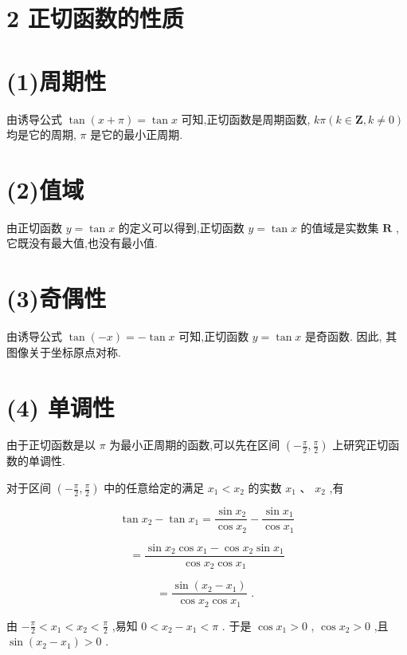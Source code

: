 \documentclass[10pt]{article}
\begin{document}
\section*{2 正切函数的性质}

\section*{(1)周期性}

由诱导公式 \(\tan \left( {x + \pi }\right)  = \tan x\) 可知,正切函数是周期函数, \({k\pi }\left( {k \in  \mathbf{Z},k \neq  0}\right)\) 均是它的周期, \(\pi\) 是它的最小正周期.

\section*{(2)值域}

由正切函数 \(y = \tan x\) 的定义可以得到,正切函数 \(y = \tan x\) 的值域是实数集 \(\mathbf{R}\) ,它既没有最大值,也没有最小值.

\section*{(3)奇偶性}

由诱导公式 \(\tan \left( {-x}\right)  =  - \tan x\) 可知,正切函数 \(y = \tan x\) 是奇函数. 因此, 其图像关于坐标原点对称.

\section*{(4) 单调性}

由于正切函数是以 \(\pi\) 为最小正周期的函数,可以先在区间 \(\left( {-\frac{\pi }{2},\frac{\pi }{2}}\right)\) 上研究正切函数的单调性.

对于区间 \(\left( {-\frac{\pi }{2},\frac{\pi }{2}}\right)\) 中的任意给定的满足 \({x}_{1} < {x}_{2}\) 的实数 \({x}_{1}\text{ 、 }{x}_{2}\) ,有

\[
\tan {x}_{2} - \tan {x}_{1} = \frac{\sin {x}_{2}}{\cos {x}_{2}} - \frac{\sin {x}_{1}}{\cos {x}_{1}}
\]

\[
= \frac{\sin {x}_{2}\cos {x}_{1} - \cos {x}_{2}\sin {x}_{1}}{\cos {x}_{2}\cos {x}_{1}}
\]

\[
= \frac{\sin \left( {{x}_{2} - {x}_{1}}\right) }{\cos {x}_{2}\cos {x}_{1}}\text{ . }
\]

由 \(- \frac{\pi }{2} < {x}_{1} < {x}_{2} < \frac{\pi }{2}\) ,易知 \(0 < {x}_{2} - {x}_{1} < \pi\) . 于是 \(\cos {x}_{1} > 0\) , \(\cos {x}_{2} > 0\) ,且 \(\sin \left( {{x}_{2} - {x}_{1}}\right)  > 0\) .
\end{document}
